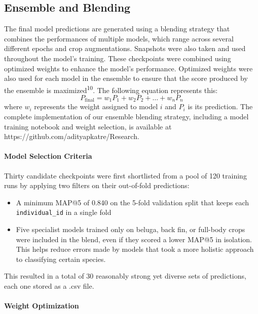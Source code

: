 \documentclass[twocolumn]{article}
\begin{document}
\subsection{Ensemble and Blending}

The final model predictions are generated using a blending strategy that combines the performances of multiple models, which range across several different epochs and crop augmentations. Snapshots were also taken and used throughout the model's training. These checkpoints were combined using optimized weights to enhance the model's performance. Optimized weights were also used for each model in the ensemble to ensure that the score produced by the ensemble is maximized\textsuperscript{10}. The following equation represents this:
\begin{equation*}
P_{\text{final}} = w_1 P_1 + w_2 P_2 + \dots + w_n P_n
\end{equation*}
 where $w_i$ represents the weight assigned to model $i$ and $P_i$ is its prediction. The complete implementation of our ensemble blending strategy, including a model training notebook and weight selection, is available at https://github.com/adityapkatre/Research.

 \paragraph{Model Selection Criteria}

Thirty candidate checkpoints were first shortlisted from a pool of 120 training runs by applying two filters on their out-of-fold predictions:
\begin{itemize}
    \item A minimum MAP@5 of 0.840 on the 5-fold validation split that keeps each \texttt{individual\_id} in a single fold
    \item Five specialist models trained only on beluga, back fin, or full-body crops were included in the blend, even if they scored a lower MAP@5 in isolation. This helps reduce errors made by models that took a more holistic approach to classifying certain species.
\end{itemize}

This resulted in a total of 30 reasonably strong yet diverse sets of predictions, each one stored as a .csv file.

\paragraph{Weight Optimization}
\end{document}

